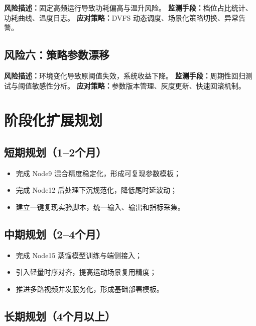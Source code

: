 \documentclass[12pt,a4paper]{ctexart}
\begin{document}
\textbf{风险描述：}固定高频运行导致功耗偏高与温升风险。\newline
\textbf{监测手段：}档位占比统计、功耗曲线、温度日志。\newline
\textbf{应对策略：}DVFS 动态调度、场景化策略切换、异常告警。

\subsection{风险六：策略参数漂移}

\textbf{风险描述：}环境变化导致原阈值失效，系统收益下降。\newline
\textbf{监测手段：}周期性回归测试与阈值敏感性分析。\newline
\textbf{应对策略：}参数版本管理、灰度更新、快速回滚机制。

\section{阶段化扩展规划}

\subsection{短期规划（1--2个月）}

\begin{itemize}
  \item 完成 Node9 混合精度稳定化，形成可复现参数模板；
  \item 完成 Node12 后处理下沉规范化，降低尾时延波动；
  \item 建立一键复现实验脚本，统一输入、输出和指标采集。
\end{itemize}

\subsection{中期规划（2--4个月）}

\begin{itemize}
  \item 完成 Node15 蒸馏模型训练与端侧接入；
  \item 引入轻量时序对齐，提高运动场景复用精度；
  \item 推进多路视频并发服务化，形成基础部署模板。
\end{itemize}

\subsection{长期规划（4个月以上）}
\end{document}
